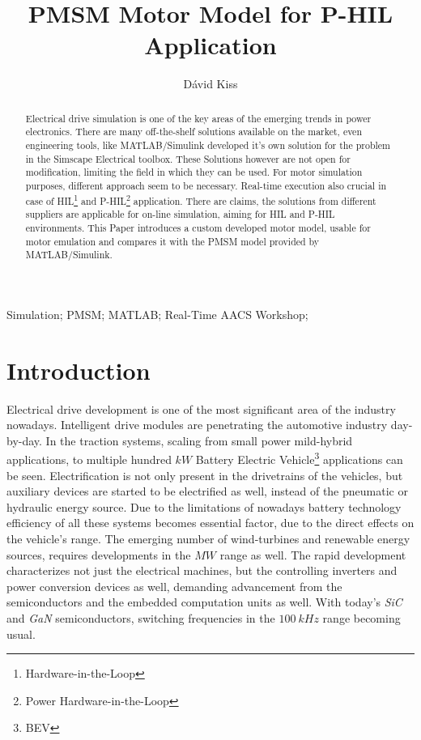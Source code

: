 \documentclass[twoside,b5paper,10pt]{article}
\title{PMSM Motor Model for P-HIL Application}
\author{Dávid Kiss}
\begin{document}
\makeAutStyleTitle

\begin{abstract}
Electrical drive simulation is one of the key areas of the emerging trends in power electronics. There are many off-the-shelf solutions available on the market, even engineering tools, like MATLAB/Simulink developed it's own solution for the problem in the Simscape Electrical toolbox. These Solutions however are not open for modification, limiting the field in which they can be used. For motor simulation purposes, different approach seem to be necessary. Real-time execution also crucial in case of HIL\footnote{Hardware-in-the-Loop} and P-HIL\footnote{Power Hardware-in-the-Loop} application.
There are claims, the solutions from different suppliers are applicable for on-line simulation, aiming for HIL and P-HIL environments. This Paper introduces a custom developed motor model, usable for motor emulation and compares it with the PMSM model provided by MATLAB/Simulink.
\end{abstract}


\begin{keywords}
Simulation; PMSM; MATLAB; Real-Time AACS Workshop; 
\end{keywords}

\listoftodos

\section{Introduction}
\label{sec:Introdu}

Electrical drive development is one of the most significant area of the industry nowadays. Intelligent drive modules are penetrating the automotive industry day-by-day. In the traction systems, scaling from small power mild-hybrid applications, to multiple hundred $kW$ Battery Electric Vehicle\footnote{BEV} applications can be seen. Electrification is not only present in the drivetrains of the vehicles, but auxiliary devices are started to be electrified as well, instead of the pneumatic or hydraulic energy source. Due to the limitations of nowadays battery technology efficiency of all these systems becomes essential factor, due to the direct effects on the vehicle's range.  The emerging number of wind-turbines and renewable energy sources, requires developments in the $MW$ range as well. The rapid development characterizes not just the electrical machines, but the controlling inverters and power conversion devices as well, demanding advancement from the semiconductors and the embedded computation units as well. With today's \emph{SiC} and \emph{GaN} semiconductors, switching frequencies in the $100\ kHz$ range becoming usual.
\end{document}
